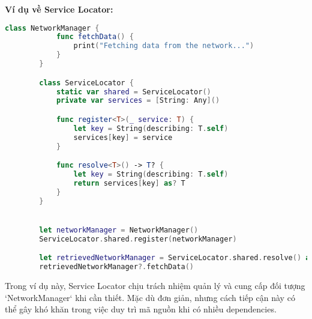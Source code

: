 \begin{itemize}
      \textbf{Ví dụ về Service Locator:}
      \begin{lstlisting}[language=Swift]
        class NetworkManager {
            func fetchData() {
                print("Fetching data from the network...")
            }
        }

        class ServiceLocator {
            static var shared = ServiceLocator()
            private var services = [String: Any]()

            func register<T>(_ service: T) {
                let key = String(describing: T.self)
                services[key] = service
            }

            func resolve<T>() -> T? {
                let key = String(describing: T.self)
                return services[key] as? T
            }
        }


        let networkManager = NetworkManager()
        ServiceLocator.shared.register(networkManager)

        let retrievedNetworkManager = ServiceLocator.shared.resolve() as NetworkManager?
        retrievedNetworkManager?.fetchData()
      \end{lstlisting}
      Trong ví dụ này, Service Locator chịu trách nhiệm quản lý và cung cấp đối tượng `NetworkManager` khi cần thiết. Mặc dù đơn giản, nhưng cách tiếp cận này có thể gây khó khăn trong việc duy trì mã nguồn khi có nhiều dependencies.
    \end{itemize}
    